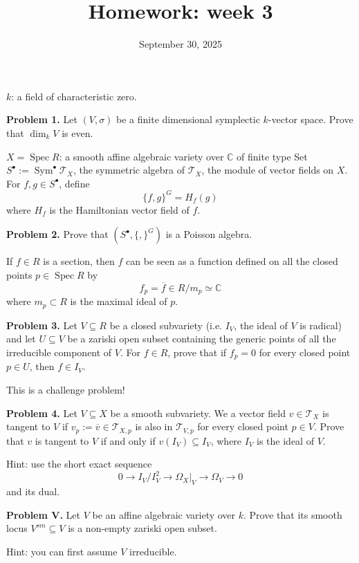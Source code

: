 \documentclass[12pt]{article}
\title{Homework: week 3}
\date{September 30, 2025}
\begin{document}
\maketitle

$k$: a field of characteristic zero.

\bigskip
\noindent
\textbf{Problem 1.} Let $(V,\sigma)$ be a finite dimensional symplectic $k$-vector space. Prove that
$\dim_k V$ is even.

\bigskip
$X=\operatorname{Spec}R$: a smooth affine algebraic variety over $\mathbb{C}$ of finite type Set $S^\bullet := \operatorname{Sym}^\bullet \mathcal{T}_X$,
the symmetric algebra of $\mathcal{T}_X$, the module of vector fields on $X$. For $f,g \in S^\bullet$, define
\[
\{f,g\}^G = H_f(g)
\]
where $H_f$ is the Hamiltonian vector field of $f$.

\bigskip
\noindent
\textbf{Problem 2.} Prove that $(S^\bullet,\{,\}^G)$ is a Poisson algebra.

\bigskip
If $f \in R$ is a section, then $f$ can be seen as a function defined on all the closed points
$p \in \operatorname{Spec}R$ by
\[
 f_p = \overline{f} \in R/m_p \simeq \mathbb{C}
\]
where $m_p \subset R$ is the maximal ideal of $p$.

\bigskip
\noindent
\textbf{Problem 3.} Let $V \subseteq R$ be a closed subvariety (i.e. $I_V$, the ideal of $V$ is radical) and let
$U \subseteq V$ be a zariski open subset containing the generic points of all the irreducible component
of $V$. For $f \in R$, prove that if $f_p=0$ for every closed point $p \in U$, then $f \in I_V$.

\bigskip
\noindent
This is a challenge problem!

\bigskip
\noindent
\textbf{Problem 4.} Let $V \subseteq X$ be a smooth subvariety. We a vector field $v \in \mathcal{T}_X$ is tangent to $V$
if $v_p := \overline{v} \in \mathcal{T}_{X,p}$ is also in $\mathcal{T}_{V,p}$ for every closed point $p \in V$. Prove that $v$ is tangent to $V$ if
and only if $v(I_V) \subseteq I_V$, where $I_V$ is the ideal of $V$.

\bigskip
\noindent
Hint: use the short exact sequence
\[
0 \to I_V/I_V^2 \to \Omega_X|_V \to \Omega_V \to 0
\]
and its dual.

\bigskip
\noindent
\textbf{Problem V.} Let $V$ be an affine algebraic variety over $k$. Prove that its smooth locus
$V^{sm} \subseteq V$ is a non-empty zariski open subset.

\bigskip
\noindent
Hint: you can first assume $V$ irreducible.
\end{document}
